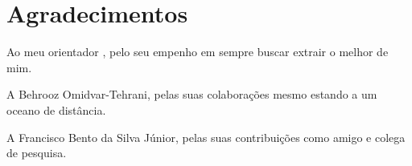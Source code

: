 
\chapter*{Agradecimentos}

Ao meu orientador \mySupervisorName, pelo seu empenho em sempre buscar extrair o melhor de mim.

A Behrooz Omidvar-Tehrani, pelas suas colaborações mesmo estando a um oceano de distância.

A Francisco Bento da Silva Júnior, pelas suas contribuições como amigo e colega de pesquisa.